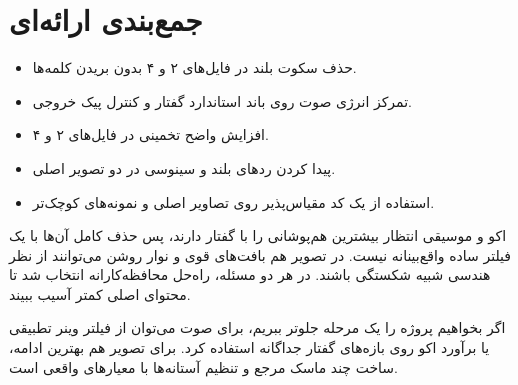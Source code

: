 \documentclass[11pt,a4paper]{article}
\newcommand{\en}[1]{\lr{#1}}
\begin{document}
\clearpage
\section{جمع‌بندی ارائه‌ای}

\begin{resultBox}
\begin{itemize}[rightmargin=5mm,itemsep=3pt]
  \item حذف سکوت بلند در فایل‌های ۲ و ۴ بدون بریدن کلمه‌ها.
  \item تمرکز انرژی صوت روی باند استاندارد گفتار و کنترل پیک خروجی.
  \item افزایش واضح \en{SNR} تخمینی در فایل‌های ۲ و ۴.
  \item پیدا کردن ردهای بلند و سینوسی در دو تصویر اصلی.
  \item استفاده از یک کد مقیاس‌پذیر روی تصاویر اصلی و نمونه‌های کوچک‌تر.
\end{itemize}
\end{resultBox}

\begin{ideaBox}
اکو و موسیقی انتظار بیشترین هم‌پوشانی را با گفتار دارند، پس حذف کامل آن‌ها با یک فیلتر ساده واقع‌بینانه نیست. در تصویر هم بافت‌های قوی و نوار روشن می‌توانند از نظر هندسی شبیه شکستگی باشند. در هر دو مسئله، راه‌حل محافظه‌کارانه انتخاب شد تا محتوای اصلی کمتر آسیب ببیند.
\end{ideaBox}

اگر بخواهیم پروژه را یک مرحله جلوتر ببریم، برای صوت می‌توان از فیلتر وینر تطبیقی یا برآورد اکو روی بازه‌های گفتار جداگانه استفاده کرد. برای تصویر هم بهترین ادامه، ساخت چند ماسک مرجع و تنظیم آستانه‌ها با معیارهای واقعی است.

\end{document}
